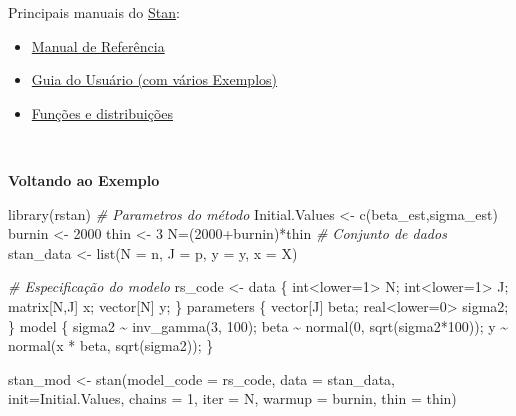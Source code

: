 \documentclass[
]{book}
\newenvironment{Shaded}{\begin{snugshade}}{\end{snugshade}}
\newcommand{\AttributeTok}[1]{\textcolor[rgb]{0.77,0.63,0.00}{#1}}
\newcommand{\CommentTok}[1]{\textcolor[rgb]{0.56,0.35,0.01}{\textit{#1}}}
\newcommand{\DecValTok}[1]{\textcolor[rgb]{0.00,0.00,0.81}{#1}}
\newcommand{\FunctionTok}[1]{\textcolor[rgb]{0.00,0.00,0.00}{#1}}
\newcommand{\NormalTok}[1]{#1}
\newcommand{\OtherTok}[1]{\textcolor[rgb]{0.56,0.35,0.01}{#1}}
\newcommand{\SpecialCharTok}[1]{\textcolor[rgb]{0.00,0.00,0.00}{#1}}
\newcommand{\StringTok}[1]{\textcolor[rgb]{0.31,0.60,0.02}{#1}}
\begin{document}
Principais manuais do \href{https://mc-stan.org/}{Stan}:

\begin{itemize}
\item
  \href{https://mc-stan.org/docs/2_27/reference-manual/index.html}{Manual de Referência}
\item
  \href{https://mc-stan.org/docs/2_27/stan-users-guide/index.html}{Guia do Usuário (com vários Exemplos)}
\item
  \href{https://mc-stan.org/docs/2_27/functions-reference/index.html}{Funções e distribuições}
\end{itemize}

\(~\)

\textbf{Voltando ao Exemplo}

\begin{Shaded}
\begin{Highlighting}[]
\FunctionTok{library}\NormalTok{(rstan)}
\CommentTok{\# Parametros do método}
\NormalTok{Initial.Values }\OtherTok{\textless{}{-}} \FunctionTok{c}\NormalTok{(beta\_est,sigma\_est)}
\NormalTok{burnin }\OtherTok{\textless{}{-}} \DecValTok{2000}
\NormalTok{thin }\OtherTok{\textless{}{-}} \DecValTok{3}
\NormalTok{N}\OtherTok{=}\NormalTok{(}\DecValTok{2000}\SpecialCharTok{+}\NormalTok{burnin)}\SpecialCharTok{*}\NormalTok{thin}
\CommentTok{\# Conjunto de dados}
\NormalTok{stan\_data }\OtherTok{\textless{}{-}} \FunctionTok{list}\NormalTok{(}\AttributeTok{N =}\NormalTok{ n, }\AttributeTok{J =}\NormalTok{ p, }\AttributeTok{y =}\NormalTok{ y, }\AttributeTok{x =}\NormalTok{ X)}

\CommentTok{\# Especificação do modelo}
\NormalTok{rs\_code }\OtherTok{\textless{}{-}} \StringTok{\textquotesingle{}}
\StringTok{  data \{}
\StringTok{    int\textless{}lower=1\textgreater{} N;}
\StringTok{    int\textless{}lower=1\textgreater{} J;}
\StringTok{    matrix[N,J] x;}
\StringTok{    vector[N] y;}
\StringTok{  \}}
\StringTok{  parameters \{}
\StringTok{    vector[J] beta;}
\StringTok{    real\textless{}lower=0\textgreater{} sigma2;}
\StringTok{  \}}
\StringTok{  model \{}
\StringTok{    sigma2 \textasciitilde{} inv\_gamma(3, 100);}
\StringTok{    beta \textasciitilde{} normal(0, sqrt(sigma2*100));}
\StringTok{    y \textasciitilde{} normal(x * beta, sqrt(sigma2));}
\StringTok{\}\textquotesingle{}}

\NormalTok{stan\_mod }\OtherTok{\textless{}{-}} \FunctionTok{stan}\NormalTok{(}\AttributeTok{model\_code =}\NormalTok{ rs\_code, }\AttributeTok{data =}\NormalTok{ stan\_data, }\AttributeTok{init=}\NormalTok{Initial.Values,}
            \AttributeTok{chains =} \DecValTok{1}\NormalTok{, }\AttributeTok{iter =}\NormalTok{ N, }\AttributeTok{warmup =}\NormalTok{ burnin, }\AttributeTok{thin =}\NormalTok{ thin)}
\end{Highlighting}
\end{Shaded}
\end{document}
